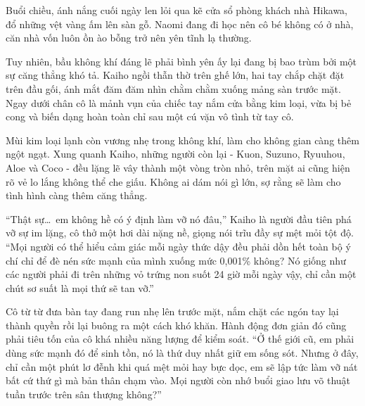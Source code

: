 ﻿\documentclass[../main.tex]{subfiles}
\begin{document}

Buổi chiều, ánh nắng cuối ngày len lỏi qua kẽ cửa sổ phòng khách nhà Hikawa, đổ những vệt vàng ấm lên sàn gỗ. Naomi đang đi học nên cô bé không có ở nhà, căn nhà vốn luôn ồn ào bỗng trở nên yên tĩnh lạ thường. 

Tuy nhiên, bầu không khí đáng lẽ phải bình yên ấy lại đang bị bao trùm bởi một sự căng thẳng khó tả. Kaiho ngồi thẫn thờ trên ghế lớn, hai tay chắp chặt đặt trên đầu gối, ánh mắt đăm đăm nhìn chằm chằm xuống mảng sàn trước mặt. Ngay dưới chân cô là mảnh vụn của chiếc tay nắm cửa bằng kim loại, vừa bị bẻ cong và biến dạng hoàn toàn chỉ sau một cú vặn vô tình từ tay cô.

Mùi kim loại lạnh còn vương nhẹ trong không khí, làm cho không gian càng thêm ngột ngạt. Xung quanh Kaiho, những người còn lại - Kuon, Suzuno, Ryuuhou, Aloe và Coco - đều lặng lẽ vây thành một vòng tròn nhỏ, trên mặt ai cũng hiện rõ vẻ lo lắng không thể che giấu. Không ai dám nói gì lớn, sợ rằng sẽ làm cho tình hình càng thêm căng thẳng.

``Thật sự\dots\ em không hề có ý định làm vỡ nó đâu,'' Kaiho là người đầu tiên phá vỡ sự im lặng, cô thở một hơi dài nặng nề, giọng nói trĩu đầy sự mệt mỏi tột độ. ``Mọi người có thể hiểu cảm giác mỗi ngày thức dậy đều phải dồn hết toàn bộ ý chí chỉ để đè nén sức mạnh của mình xuống mức 0,001\% không? Nó giống như các người phải đi trên những vỏ trứng non suốt 24 giờ mỗi ngày vậy, chỉ cần một chút sơ suất là mọi thứ sẽ tan vỡ.''

Cô từ từ đưa bàn tay đang run nhẹ lên trước mặt, nắm chặt các ngón tay lại thành quyền rồi lại buông ra một cách khó khăn. Hành động đơn giản đó cũng phải tiêu tốn của cô khá nhiều năng lượng để kiểm soát. ``Ở thế giới cũ, em phải dùng sức mạnh đó để sinh tồn, nó là thứ duy nhất giữ em sống sót. Nhưng ở đây, chỉ cần một phút lơ đễnh khi quá mệt mỏi hay bực dọc, em sẽ lập tức làm vỡ nát bất cứ thứ gì mà bản thân chạm vào. Mọi người còn nhớ buổi giao lưu võ thuật tuần trước trên sân thượng không?''
\end{document}

